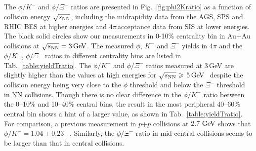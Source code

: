 \documentclass[%
 reprint,	
showpacs,
 amsmath,amssymb,
 aps,
 superscriptaddress,
]{revtex4-1}
\begin{document}
The $\phi/K^-$ and $\phi/\Xi^-$ ratios are presented in Fig.~\ref{fig:phi2Kratio} as a function of collision energy $\sqrt{s_{\rm NN}}$, including the midrapidity data from the AGS, SPS and RHIC BES at higher energies and $4\pi$\,acceptance data from SIS at lower energies. The black solid circles show our measurements in 0-10\% centrality bin in Au+Au collisions at ${\sqrt{s_{\rm NN}} = \rm{3\,GeV}}$. The measured $\phi$, $K^-$ and $\Xi^-$ yields in 4$\pi$ and the $\phi/K^-$, $\phi/\Xi^-$ ratios in different centrality bins are listed in Tab.~\ref{table:yieldTratio}. The $\phi/K^-$ and $\phi/\Xi^-$ ratios measured at 3\,GeV are %
slightly higher than the values at high energies for $\sqrt{s_{\rm NN}}\geqslant$ 5\,GeV~\cite{NA49_phi,NA49_piK,NA49_piK2,E917_phi,ALICE_phi_2p7TeV,STAR_phi_64a200GeV,Xi_ArKCl_HADES,star_bes_strangeness} despite the collision energy being very close to the $\phi$ threshold and below the $\Xi^-$ threshold in NN collisions. %
Though there is no clear difference in the $\phi/K^-$ ratio between the \textup{0--10\%} and \textup{10--40\%} central bins, the result in the most peripheral 40--60\% central bin shows a hint of a larger value, as shown in Tab.~\ref{table:yieldTratio}. For comparison, a previous measurement in $p$+$p$ collisions at $\textup{2.7 GeV}$ shows that $\phi/K^- = 1.04\pm0.23$ ~\cite{ANKE_phi}. Similarly, the $\phi/\Xi^-$ ratio in mid-central collisions seems to be larger than that in central collisions.
\end{document}
